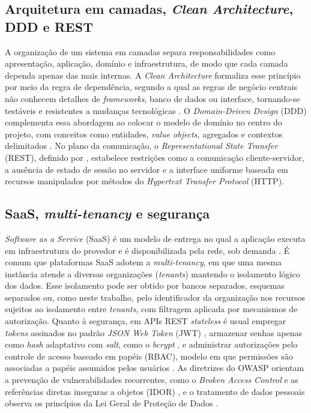 \documentclass[a4paper,12pt]{article}
\begin{document}
\subsection{Arquitetura em camadas, \textit{Clean Architecture}, DDD e REST}

A organização de um sistema em camadas separa responsabilidades como apresentação, aplicação, domínio e infraestrutura, de modo que cada camada dependa apenas das mais internas. A \textit{Clean Architecture} formaliza esse princípio por meio da regra de dependência, segundo a qual as regras de negócio centrais não conhecem detalhes de \textit{frameworks}, banco de dados ou interface, tornando-se testáveis e resistentes a mudanças tecnológicas \cite{martin2017}. O \textit{Domain-Driven Design} (DDD) complementa essa abordagem ao colocar o modelo de domínio no centro do projeto, com conceitos como entidades, \textit{value objects}, agregados e contextos delimitados \cite{evans2003}. No plano da comunicação, o \textit{Representational State Transfer} (REST), definido por , estabelece restrições como a comunicação cliente-servidor, a ausência de estado de sessão no servidor e a interface uniforme baseada em recursos manipulados por métodos do \textit{Hypertext Transfer Protocol} (HTTP).

\subsection{SaaS, \textit{multi-tenancy} e segurança}
\label{sec:saas}

\textit{Software as a Service} (SaaS) é um modelo de entrega no qual a aplicação executa em infraestrutura do provedor e é disponibilizada pela rede, sob demanda \cite{nist800145}. É comum que plataformas SaaS adotem a \textit{multi-tenancy}, em que uma mesma instância atende a diversas organizações (\textit{tenants}) mantendo o isolamento lógico dos dados. Esse isolamento pode ser obtido por bancos separados, esquemas separados ou, como neste trabalho, pelo identificador da organização nos recursos sujeitos ao isolamento entre \textit{tenants}, com filtragem aplicada por mecanismos de autorização. Quanto à segurança, em APIs REST \textit{stateless} é usual empregar \textit{tokens} assinados no padrão \textit{JSON Web Token} (JWT) \cite{rfc7519}, armazenar senhas apenas como \textit{hash} adaptativo com \textit{salt}, como o \textit{bcrypt} \cite{bcrypt}, e administrar autorizações pelo controle de acesso baseado em papéis (RBAC), modelo em que permissões são associadas a papéis assumidos pelos usuários \cite{nistRbacGlossary,nistsp80053}. As diretrizes do OWASP orientam a prevenção de vulnerabilidades recorrentes, como o \textit{Broken Access Control} e as referências diretas inseguras a objetos (IDOR) \cite{owasptop10}, e o tratamento de dados pessoais observa os princípios da Lei Geral de Proteção de Dados \cite{lgpd}.
\end{document}
